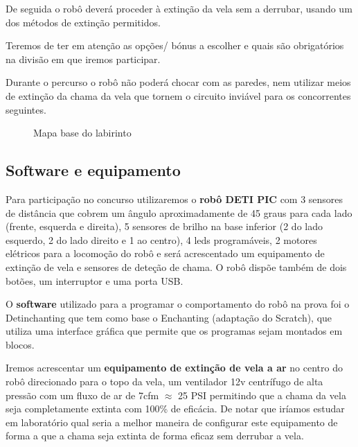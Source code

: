 \documentclass[pdftex,12pt,a4paper]{report}
\begin{document}
De seguida o robô deverá proceder à extinção da vela sem a derrubar, usando um dos métodos de extinção permitidos. 

Teremos de ter em atenção as opções/ bónus a escolher e quais são obrigatórios na divisão em que iremos participar.

Durante o percurso o robô não poderá chocar com as paredes, nem utilizar meios de extinção da chama da vela que tornem o circuito inviável para os concorrentes seguintes.

\begin{figure}[h]
\centerline{}
\caption{Mapa base do labirinto }\label{mapa}
\end{figure}

\clearpage
\subsection{Software e equipamento}

	Para participação no concurso utilizaremos o \textbf{robô DETI PIC}
com 3 sensores de distância que cobrem um ângulo aproximadamente de 45 graus para cada lado (frente, esquerda e direita), 5 sensores de brilho na base inferior (2 do lado esquerdo, 2 do lado direito e 1 ao centro), 4 leds\footnotemark{}  programáveis, 2 motores elétricos para a locomoção do robô e será acrescentado um equipamento de extinção de vela e sensores de deteção de chama. O robô dispõe também de dois botões, um interruptor e uma porta USB\footnotemark{}. 

	O \textbf{software} utilizado para a programar o comportamento do robô na prova foi o Detinchanting que tem como base o Enchan\-ting\footnotemark{} (adaptação do Scratch), que utiliza uma interface gráfica que permite que os programas sejam montados em blocos.
	
	Iremos acrescentar um \textbf{equipamento de extinção de vela a ar} no centro do robô direcionado para o topo da vela, um ventilador\cite{Ventilador:28122012} 12v centrífugo de alta pressão com um fluxo de ar de 7cfm\footnotemark{} $\approx$ 25 PSI\footnotemark{} permitindo que a chama da vela seja completamente extinta com 100\% de eficácia. De notar que iríamos estudar em laboratório qual seria a melhor maneira de configurar este equipamento de forma a que a chama seja extinta de forma eficaz sem derrubar a vela.
	
\end{document}

